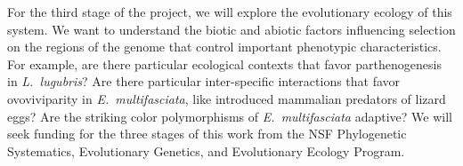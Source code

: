 For the third stage of the project, we will explore the evolutionary ecology of
this system.
We want to understand the biotic and abiotic factors influencing selection on
the regions of the genome that control important phenotypic characteristics.
For example, are there particular ecological contexts that favor
parthenogenesis in \emph{L.\ lugubris}?
Are there particular inter-specific interactions that favor ovoviviparity in
\emph{E.\ multifasciata}, like introduced mammalian predators of lizard eggs?
Are the striking color polymorphisms of \emph{E.\ multifasciata} adaptive?
We will seek funding for the three stages of this work from the NSF
Phylogenetic Systematics, Evolutionary Genetics, and Evolutionary Ecology
Program.

